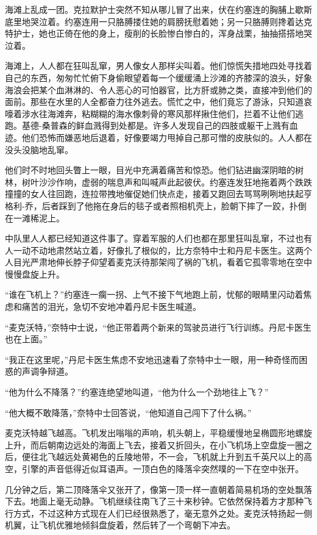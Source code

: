     海滩上乱成一团。克拉默护士突然不知从哪儿冒了出来，伏在约塞连的胸脯上歇斯底里地哭泣着。约塞连用一只胳膊搂住她的肩膀抚慰着她；另一只胳膊则搀着达克特护士，她也正倚在他的身上，瘦削的长脸惨白惨白的，浑身战栗，抽抽搭搭地哭泣着。

    海滩上，人人都在狂叫乱窜，男人像女人那样尖叫着。他们惊慌失措地四处寻找着自己的东西，匆匆忙忙俯下身偷眼望着每一个缓缓涌上沙滩的齐膝深的浪头，好象海浪会把某个血淋淋的、令人恶心的可怕器官，比方肝或肺之类，直接冲到他们的面前。那些在水里的人全都奋力往外逃去。慌忙之中，他们竟忘了游泳，只知道哀嚎着涉水往海滩奔，粘糊糊的海水像刺骨的寒风那样揪住他们，拦着不让他们逃跑。基德-桑普森的鲜血溅得到处都是。许多人发现自己的四肢或躯干上溅有血迹。他们恐怖而嫌恶地后退着，好像要竭力甩掉自己那可憎的皮肤似的。人人都在没头没脑地乱窜。

    他们时不时地回头瞥上一眼，目光中充满着痛苦和惊恐。他们钻进幽深阴暗的树林，树叶沙沙作响，虚弱的喘息声和叫喊声此起彼伏。约塞连发狂地拖着两个跌跌撞撞的女人往回跑，连拉带拽地催促她们快点走，接着又跑回去骂骂咧咧地扶起亨格利-乔，后者踩到了他拖在身后的毯子或者照相机壳上，脸朝下摔了一跤，扑倒在一滩稀泥上。

    中队里人人都已经知道这件事了。穿着军服的人们也都在那里狂叫乱窜，不过也有人一动不动地肃然站立着，好像扎了根似的，比方奈特中士和丹尼卡医生。这两个人目光严肃地伸长脖子仰望着麦克沃待那架闯了祸的飞机，看着它孤零零地在空中慢慢盘旋上升。

    “谁在飞机上？”约塞连一瘸一拐、上气不接下气地跑上前，忧郁的眼睛里闪动着焦虑和痛苦的泪光，急切不安地冲着丹尼卡医生喊道。

    “麦克沃特，”奈特中士说，“他正带着两个新来的驾驶员进行飞行训练。丹尼卡医生也在上面。”

    “我正在这里呢，”丹尼卡医生焦虑不安地迅速看了奈特中士一眼，用一种奇怪而困惑的声调争辩道。

    “他为什么不降落？”约塞连绝望地叫道，“他为什么一个劲地往上飞？”

    “他大概不敢降落，”奈特中士回答说，“他知道自己闯下了什么祸。”

    麦克沃特越飞越高。飞机发出嗡嗡的声响，机头朝上，平稳缓慢地呈椭圆形地螺旋上升，而后朝南边远处的海面上飞去，接着又折回头，在小飞机场上空盘旋一圈之后，便往北飞越远处黄褐色的丘陵地带，不一会，飞机就上升到五千英尺以上的高空，引擎的声音低得近似耳语声。一顶白色的降落伞突然噗的一下在空中张开。

    几分钟之后，第二顶降落伞又张开了，像第一顶一样一直朝着简易机场的空处飘落下去。地面上毫无动静。飞机继续往南飞了三十来秒钟。它依然保持着方才那种飞行方式，不过这种方式现在人们已经很熟悉了，毫无意外之处。麦克沃特扬起一侧机翼，让飞机优雅地倾斜盘旋着，然后转了一个弯朝下冲去。

